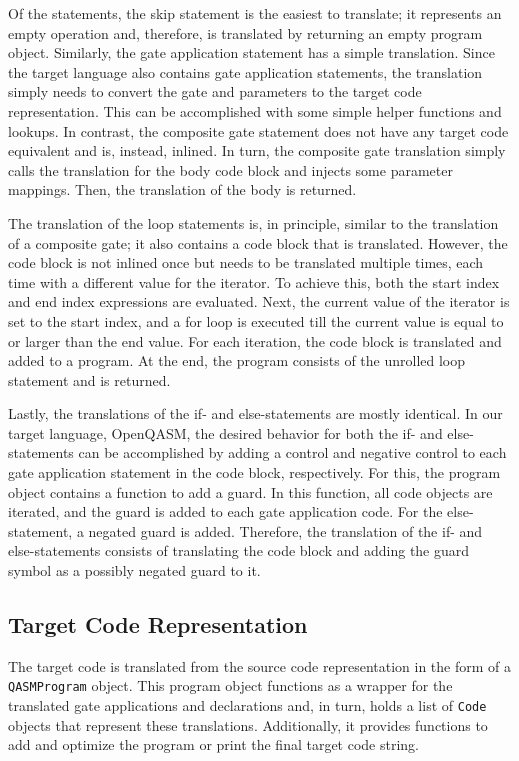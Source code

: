 Of the statements, the skip statement is the easiest to translate; it represents an empty operation and, therefore, is translated by returning an empty program object. Similarly, the gate application statement has a simple translation. Since the target language also contains gate application statements, the translation simply needs to convert the gate and parameters to the target code representation. This can be accomplished with some simple helper functions and lookups. In contrast, the composite gate statement does not have any target code equivalent and is, instead, inlined. In turn, the composite gate translation simply calls the translation for the body code block and injects some parameter mappings. Then, the translation of the body is returned.

The translation of the loop statements is, in principle, similar to the translation of a composite gate; it also contains a code block that is translated. However, the code block is not inlined once but needs to be translated multiple times, each time with a different value for the iterator. To achieve this, both the start index and end index expressions are evaluated. Next, the current value of the iterator is set to the start index, and a for loop is executed till the current value is equal to or larger than the end value. For each iteration, the code block is translated and added to a program. At the end, the program consists of the unrolled loop statement and is returned. 

Lastly, the translations of the if- and else-statements are mostly identical. In our target language, OpenQASM, the desired behavior for both the if- and else-statements can be accomplished by adding a control and negative control to each gate application statement in the code block, respectively. For this, the program object contains a function to add a guard. In this function, all code objects are iterated, and the guard is added to each gate application code. For the else-statement, a negated guard is added. Therefore, the translation of the if- and else-statements consists of translating the code block and adding the guard symbol as a possibly negated guard to it. 

\subsection{Target Code Representation}
\label{sec:implementation_targetCode}
The target code is translated from the source code representation in the form of a \texttt{QASMProgram} object. This program object functions as a wrapper for the translated gate applications and declarations and, in turn, holds a list of \texttt{Code} objects that represent these translations. Additionally, it provides functions to add and optimize the program or print the final target code string. 

